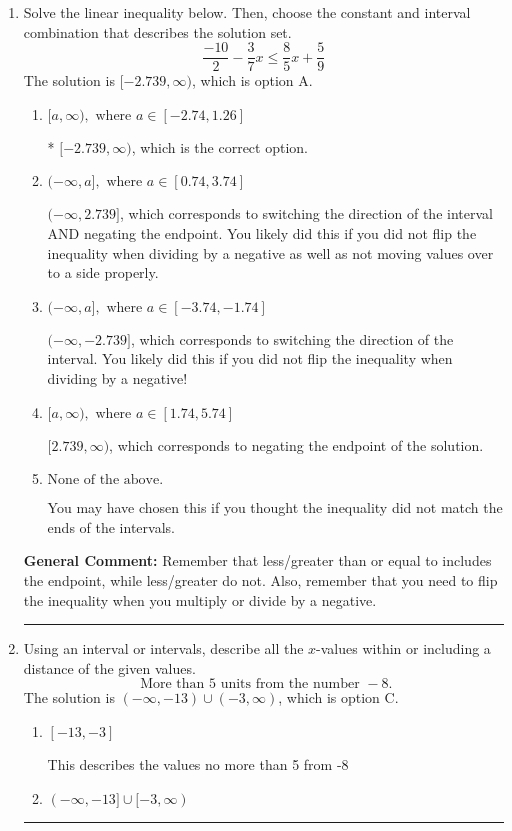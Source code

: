 \documentclass{extbook}[14pt]
\newcommand{\litem}[1]{\item #1

\rule{\textwidth}{0.4pt}}
\begin{document}
\begin{enumerate}\litem{
Solve the linear inequality below. Then, choose the constant and interval combination that describes the solution set.
\[ \frac{-10}{2} - \frac{3}{7} x \leq \frac{8}{5} x + \frac{5}{9} \]The solution is \( [-2.739, \infty) \), which is option A.\begin{enumerate}[label=\Alph*.]
\item \( [a, \infty), \text{ where } a \in [-2.74, 1.26] \)

* $[-2.739, \infty)$, which is the correct option.
\item \( (-\infty, a], \text{ where } a \in [0.74, 3.74] \)

 $(-\infty, 2.739]$, which corresponds to switching the direction of the interval AND negating the endpoint. You likely did this if you did not flip the inequality when dividing by a negative as well as not moving values over to a side properly.
\item \( (-\infty, a], \text{ where } a \in [-3.74, -1.74] \)

 $(-\infty, -2.739]$, which corresponds to switching the direction of the interval. You likely did this if you did not flip the inequality when dividing by a negative!
\item \( [a, \infty), \text{ where } a \in [1.74, 5.74] \)

 $[2.739, \infty)$, which corresponds to negating the endpoint of the solution.
\item \( \text{None of the above}. \)

You may have chosen this if you thought the inequality did not match the ends of the intervals.
\end{enumerate}

\textbf{General Comment:} Remember that less/greater than or equal to includes the endpoint, while less/greater do not. Also, remember that you need to flip the inequality when you multiply or divide by a negative.
}
\litem{
Using an interval or intervals, describe all the $x$-values within or including a distance of the given values.
\[ \text{ More than } 5 \text{ units from the number } -8. \]The solution is \( (-\infty, -13) \cup (-3, \infty) \), which is option C.\begin{enumerate}[label=\Alph*.]
\item \( [-13, -3] \)

This describes the values no more than 5 from -8
\item \( (-\infty, -13] \cup [-3, \infty) \)


\end{enumerate}}
\end{enumerate}
\end{document}
